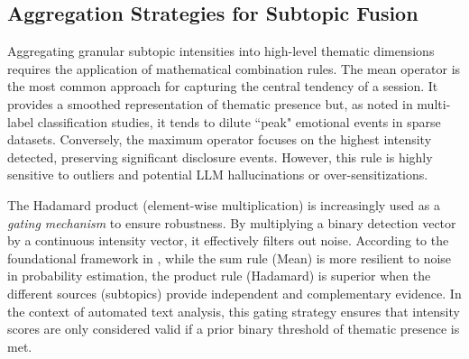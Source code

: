 \subsection{Aggregation Strategies for Subtopic Fusion}

Aggregating granular subtopic intensities into high-level thematic dimensions requires the application of mathematical combination rules. 
The mean operator is the most common approach for capturing the central tendency of a session. It provides a smoothed representation of thematic presence but, as noted in multi-label classification studies, it tends to dilute ``peak" emotional events in sparse datasets. Conversely, the maximum operator focuses on the highest intensity detected, preserving significant disclosure events. However, this rule is highly sensitive to outliers and potential LLM hallucinations or over-sensitizations.

The Hadamard product (element-wise multiplication) is increasingly used as a \textit{gating mechanism} to ensure robustness. By multiplying a binary detection vector by a continuous intensity vector, it effectively filters out noise. According to the foundational framework in \cite{Kittler1998}, while the sum rule (Mean) is more resilient to noise in probability estimation, the product rule (Hadamard) is superior when the different sources (subtopics) provide independent and complementary evidence. In the context of automated text analysis, this gating strategy ensures that intensity scores are only considered valid if a prior binary threshold of thematic presence is met.








